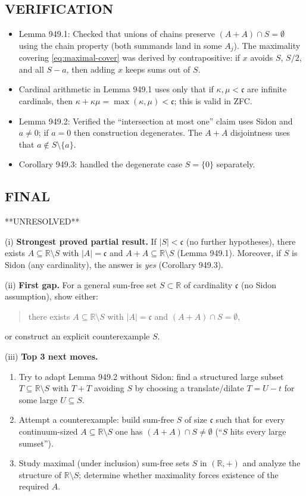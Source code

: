 \subsection*{VERIFICATION}
\begin{itemize}
\item Lemma 949.1: Checked that unions of chains preserve $(A+A)\cap S=\emptyset$ using the chain property (both summands land in some $A_j$). The maximality covering \eqref{eq:maximal-cover} was derived by contrapositive: if $x$ avoids $S$, $S/2$, and all $S-a$, then adding $x$ keeps sums out of $S$.
\item Cardinal arithmetic in Lemma 949.1 uses only that if $\kappa,\mu<\mathfrak c$ are infinite cardinals, then $\kappa+\kappa\mu=\max(\kappa,\mu)<\mathfrak c$; this is valid in ZFC.
\item Lemma 949.2: Verified the ``intersection at most one'' claim uses Sidon and $a\ne0$; if $a=0$ then construction degenerates. The $A+A$ disjointness uses that $a\notin S\setminus\{a\}$.
\item Corollary 949.3: handled the degenerate case $S=\{0\}$ separately.
\end{itemize}

\subsection*{FINAL}
**UNRESOLVED**

(i) \textbf{Strongest proved partial result.}
If $|S|<\mathfrak c$ (no further hypotheses), there exists $A\subseteq\mathbb R\setminus S$ with $|A|=\mathfrak c$ and $A+A\subseteq\mathbb R\setminus S$ (Lemma 949.1). Moreover, if $S$ is Sidon (any cardinality), the answer is \emph{yes} (Corollary 949.3).

(ii) \textbf{First gap.}
For a general sum-free set $S\subset\mathbb R$ of cardinality $\mathfrak c$ (no Sidon assumption), show either:
\begin{quote}
there exists $A\subseteq\mathbb R\setminus S$ with $|A|=\mathfrak c$ and $(A+A)\cap S=\emptyset$,
\end{quote}
or construct an explicit counterexample $S$.

(iii) \textbf{Top 3 next moves.}
\begin{enumerate}
\item Try to adapt Lemma 949.2 without Sidon: find a structured large subset $T\subseteq \mathbb R\setminus S$ with $T+T$ avoiding $S$ by choosing a translate/dilate $T=U-t$ for some large $U\subseteq S$.
\item Attempt a counterexample: build sum-free $S$ of size $\mathfrak c$ such that for every continuum-sized $A\subseteq \mathbb R\setminus S$ one has $(A+A)\cap S\ne\emptyset$ (``$S$ hits every large sumset'').
\item Study maximal (under inclusion) sum-free sets $S$ in $(\mathbb R,+)$ and analyze the structure of $\mathbb R\setminus S$; determine whether maximality forces existence of the required $A$.
\end{enumerate}

